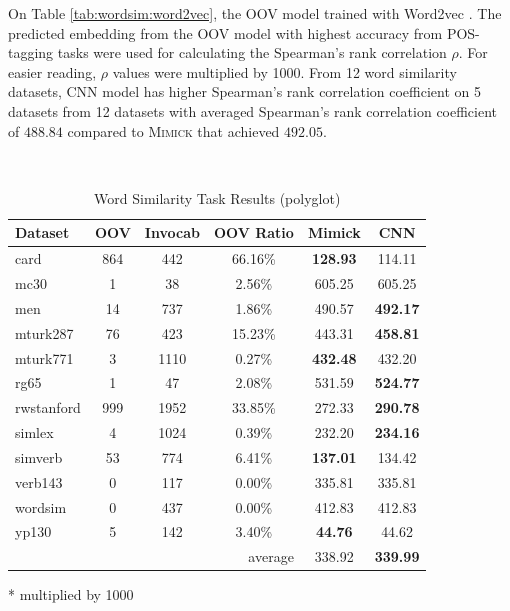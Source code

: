     On Table \ref{tab:wordsim:word2vec}, the OOV model trained with
    Word2vec \citep{Distributed2013mikolov}. The predicted embedding
    from the OOV model with highest accuracy from POS-tagging tasks
    were used for calculating the Spearman's rank correlation $\rho$.
    For easier reading, $\rho$ values were multiplied by 1000. From
    12 word similarity datasets, CNN model has higher Spearman's rank
    correlation coefficient on 5 datasets from 12 datasets with
    averaged Spearman's rank correlation coefficient of $488.84$ compared to
    \textsc{Mimick} that achieved $492.05$.

    \begin{table}[!ht]
      \begin{threeparttable} 
      \begin{center}
        \caption{Word Similarity Task Results (polyglot)}
        ~\\
        \label{tab:wordsim:polyglot}
        \begin{tabular}{l|c|c|c|c|c}
          \textbf{Dataset} & \textbf{OOV} & \textbf{Invocab} & \textbf{OOV Ratio} & \textbf{Mimick}\tnote{*} & \textbf{CNN}\tnote{*}\\
          \hline
          card & 864 & 442 & 66.16\% & \textbf{128.93} & 114.11\\
          mc30 & 1 & 38 & 2.56\% & 605.25 & 605.25\\
          men & 14 & 737 & 1.86\% & 490.57 & \textbf{492.17}\\
          mturk287 & 76 & 423 & 15.23\% & 443.31 & \textbf{458.81}\\
          mturk771 & 3 & 1110 & 0.27\% & \textbf{432.48} & 432.20\\
          rg65 & 1 & 47 & 2.08\% & 531.59 & \textbf{524.77}\\
          rwstanford & 999 & 1952 & 33.85\% & 272.33 & \textbf{290.78}\\
          simlex & 4 & 1024 & 0.39\% & 232.20 & \textbf{234.16}\\
          simverb & 53 & 774 & 6.41\% & \textbf{137.01} & 134.42\\
          verb143 & 0 & 117 & 0.00\% & 335.81 & 335.81\\
          wordsim & 0 & 437 & 0.00\% & 412.83 & 412.83\\
          yp130 & 5 & 142 & 3.40\% & \textbf{44.76} & 44.62\\
          \hline
          \multicolumn{4}{r|}{average} & 338.92 & \textbf{339.99}\\
        \end{tabular}
        \begin{tablenotes}
          \item[*] multiplied by 1000
        \end{tablenotes}
      \end{center}
    \end{threeparttable} 
    \end{table}

